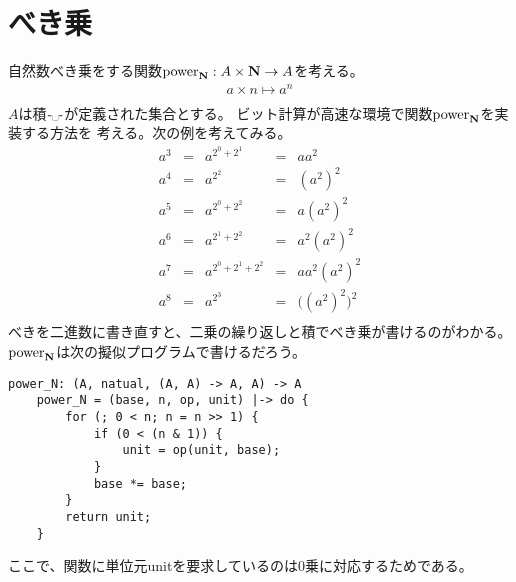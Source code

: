 \section{べき乗}\label{s1:自然数のべき乗} %
	自然数べき乗をする関数$\operatorname{power}_{{\mathbf{N}}}:A\times{\ensuremath{\mathbf{N}}}\to A$を考える。
	\begin{equation*}\begin{split} %
		a\times n \mapsto a^n \\
	\end{split}\end{equation*} %
	$A$は積$\mybiop{\myspace}$が定義された集合とする。
	ビット計算が高速な環境で関数$\operatorname{power}_{{\mathbf{N}}}$を実装する方法を
	考える。次の例を考えてみる。
	\begin{equation*}\begin{matrix} %
		a^3 &=& a^{2^0+2^1} &=& aa^2 \\
		a^4 &=& a^{2^2} &=& (a^2)^2 \\
		a^5 &=& a^{2^0+2^2} &=& a(a^2)^2 \\
		a^6 &=& a^{2^1+2^2} &=& a^2(a^2)^2 \\
		a^7 &=& a^{2^0+2^1+2^2} &=& aa^2(a^2)^2 \\
		a^8 &=& a^{2^3} &=& \bigl((a^2)^2\bigr)^2 \\
	\end{matrix}\end{equation*} %
	べきを二進数に書き直すと、二乗の繰り返しと積でべき乗が書けるのがわかる。
	$\operatorname{power}_{{\mathbf{N}}}$は次の擬似プログラムで書けるだろう。
	\begin{lstlisting}[caption=自然数べき乗のプログラム
	, label=code:自然数べき乗のプログラム]
	power_N: (A, natual, (A, A) -> A, A) -> A
	power_N = (base, n, op, unit) |-> do {
		for (; 0 < n; n = n >> 1) {
			if (0 < (n & 1)) {
				unit = op(unit, base);
			}
			base *= base;
		}
		return unit;
	}
	\end{lstlisting}
	ここで、関数に単位元unitを要求しているのは$0$乗に対応するためである。
